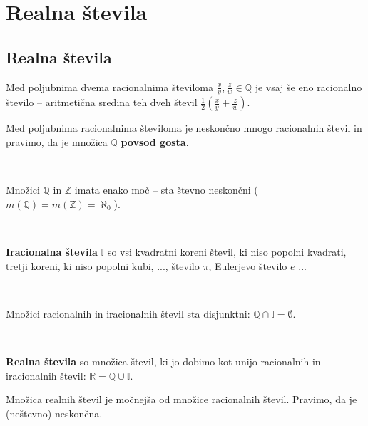 \chapter{Realna števila}

    \section{Realna števila}

        

                Med poljubnima dvema racionalnima številoma $\frac{x}{y}, \frac{z}{w}\in\mathbb{Q}$ je vsaj še eno racionalno število
                 -- aritmetična sredina teh dveh števil $\frac{1}{2}\left(\frac{x}{y}+\frac{z}{w}\right)$.

            
            
                
            
                Med poljubnima racionalnima številoma je neskončno mnogo racionalnih števil in pravimo, da je množica $\mathbb{Q}$ \textbf{povsod gosta}. 
            
                ~
            
                Množici $\mathbb{Q}$ in $\mathbb{Z}$ imata enako moč -- sta števno neskončni ($m(\mathbb{Q})=m(\mathbb{Z})=\aleph_0$).
            
        

                ~
        
                \textbf{Iracionalna števila} $\mathbb{I}$ so vsi kvadratni koreni števil, ki niso popolni kvadrati, tretji koreni, ki niso popolni kubi, ..., 
                število $\pi$, Eulerjevo število $e$ ... 
            
                ~
            
                Množici racionalnih in iracionalnih števil sta disjunktni: $\mathbb{Q}\cap\mathbb{I}=\emptyset$.
            
                
                ~

                \textbf{Realna števila} so množica števil, ki jo dobimo kot unijo racionalnih in iracionalnih števil: $\mathbb{R}=\mathbb{Q}\cup\mathbb{I}$.
            

            
                Množica realnih števil je močnejša od množice racionalnih števil. Pravimo, da je (neštevno) neskončna.
            

